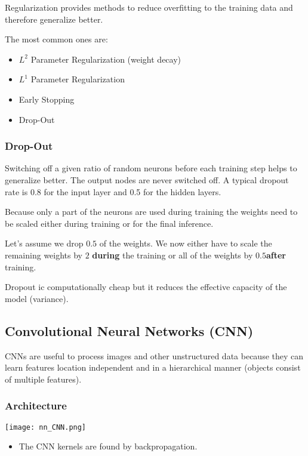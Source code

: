 Regularization provides methods to reduce overfitting to the training data and therefore generalize better.

The most common ones are:
\begin{itemize}
    \item $L^2$ Parameter Regularization (weight decay)
    \item $L^1$ Parameter Regularization
    \item Early Stopping
    \item Drop-Out
\end{itemize}

\subsubsection{Drop-Out}

Switching off a given ratio of random neurons before each training step helps to generalize better. The output nodes are never switched off. A typical dropout rate is 0.8 for the input layer and 0.5 for the hidden layers.

\newpar{}

Because only a part of the neurons are used during training the weights need to be scaled either during training or for the final inference.

Let's assume we drop $0.5$ of the weights. We now either have to scale the remaining weights by $2$ \textbf{during} the training or all of the weights by $0.5$\textbf{after} training.

\newpar{}
Dropout ic computationally cheap but it reduces the effective capacity of the model (variance).

\subsection{Convolutional Neural Networks (CNN)}

CNNs are useful to process images and other unstructured data because they can learn features location independent and in a hierarchical manner (objects consist of multiple features).
\newpar{}

\subsubsection{Architecture}
\begin{center}
    \texttt{[image: nn\_CNN.png]}
\end{center}
\newpar{}
\begin{itemize}
    \item The CNN kernels are found by backpropagation.
\end{itemize}

